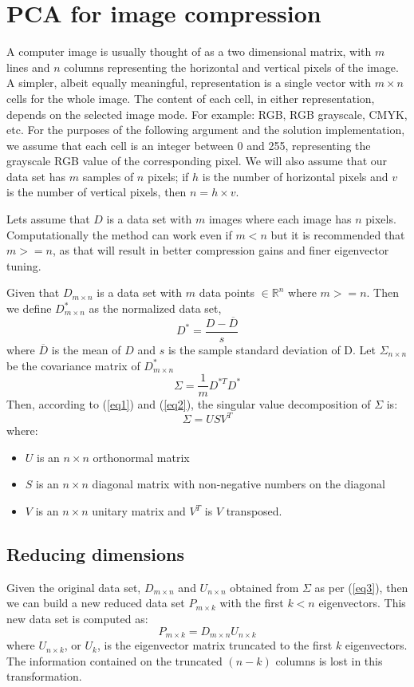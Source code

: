 \documentclass{article} %
\begin{document}
\section{PCA for image compression}
A computer image is usually thought of as a two dimensional matrix, with $m$ lines and $n$ columns representing the horizontal and vertical pixels of the image. A simpler, albeit equally meaningful, representation is a single vector with $m\times n$ cells for the whole image. The content of each cell, in either representation, depends on the selected image mode. For example: RGB, RGB grayscale, CMYK, etc. For the purposes of the following argument and the solution implementation, we assume that each cell is an integer between 0 and 255, representing the grayscale RGB value of the corresponding pixel. We will also assume that our data set has $m$ samples of $n$ pixels; if $h$ is the number of horizontal pixels and $v$ is the number of vertical pixels, then $n=h\times v$.\par
Lets assume that $D$ is a data set with $m$ images where each image has $n$ pixels. Computationally the method can work even if $m<n$ but it is recommended that $m >= n$, as that will result in better compression gains and finer eigenvector tuning.\par
Given that $D_{m\times n}$ is a data set with $m$ data points $\in \mathbb{R}^n$ where $m >= n$. Then we define ${D}_{m\times n}^*$ as the normalized data set, \[D^* = \frac{D-\overline{D}}{s}\] 
where $\overline{D}$ is the mean of $D$ and $s$ is the sample standard deviation of D. Let $\Sigma_{n\times n}$ be the covariance matrix of $D^{*}_{m\times n}$ \[\Sigma = \frac{1}{m}D^{*T}D^*\] Then, according to (\ref{eq1}) and (\ref{eq2}), the singular value decomposition of $\Sigma$ is: 
\begin{equation}\label{eq3}
\Sigma = US V^T
\end{equation}
where:
\begin{itemize}
\item $U$ is an $n\times n$ orthonormal matrix
\item $S$ is an $n\times n$ diagonal matrix with non-negative numbers on the diagonal
\item $V$ is an $n\times n$ unitary matrix and $V^T$ is $V$ transposed.
\end{itemize}

\subsection{Reducing dimensions}
Given the original data set, $D_{m\times n}$ and $U_{n\times n}$ obtained from $\Sigma$ as per (\ref{eq3}), then we can build a new reduced data set $P_{m\times k}$ with the first $k<n$ eigenvectors. This new data set is computed as:
\begin{equation}\label{eq4}
P_{m\times k} = D_{m\times n} U_{n\times k}
\end{equation}
where $U_{n\times k}$, or $U_k$, is the eigenvector matrix truncated to the first $k$ eigenvectors. The information contained on the truncated $(n-k)$ columns is lost in this transformation.
\end{document}

